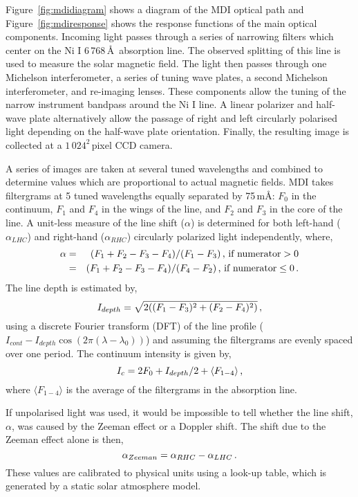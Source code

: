Figure~\ref{fig:mdidiagram} shows a diagram of the MDI optical path and Figure~\ref{fig:mdiresponse} shows the response functions of the main optical components. Incoming light passes through a series of narrowing filters which center on the Ni I 6\,768\,\AA\ absorption line. The observed  splitting of this line is used to measure the solar magnetic field. The light then passes through one Michelson interferometer, a series of tuning wave plates, a second Michelson interferometer, and re-imaging lenses. These components allow the tuning of the narrow instrument bandpass around the Ni I line. A linear polarizer and half-wave plate alternatively allow the passage of right and left circularly polarised light depending on the half-wave plate orientation.
Finally, the resulting image is collected at a $1\,024^2$\,pixel \gls{CCD} camera.

A series of images are taken at several tuned wavelengths and combined to determine values which are proportional to actual magnetic fields. MDI takes filtergrams at 5 tuned wavelengths equally separated by 75\,m\AA: $F_{0}$ in the continuum, $F_{1}$ and $F_{4}$ in the wings of the line, and $F_{2}$ and $F_{3}$ in the core of the line. A unit-less measure of the line shift ($\alpha$) is determined for both left-hand ($\alpha_{LHC}$) and right-hand ($\alpha_{RHC}$) circularly polarized light independently, where,
\begin{eqnarray}
\alpha &=& (F_{1}+F_{2}-F_{3}-F_{4})/(F_{1}-F_{3}) \mbox{\,, if numerator} > 0 \\
&=& (F_{1}+F_{2}-F_{3}-F_{4})/(F_{4}-F_{2}) \mbox{\,, if numerator} \le 0 \mbox{\,.}
\end{eqnarray}
The line depth is estimated by,
\begin{equation}
I_{depth} = \sqrt{2 ((F_1-F_3)^2 + (F_2-F_4)^2)} \mbox{\,,}
\end{equation}
using a discrete Fourier transform (DFT) of the line profile ($I_{cont}-I_{depth}\cos(2\pi (\lambda - \lambda_0))$) and assuming the filtergrams are evenly spaced over one period. The continuum intensity is given by,
\begin{equation}
I_c = 2F_0 + I_{depth}/2 + \langle F_{1-4} \rangle \mbox{\,,}
\end{equation}
where $\langle F_{1-4} \rangle$ is the average of the filtergrams in the absorption line.

If unpolarised light was used, it would be impossible to tell whether the line shift, $\alpha$, was caused by the Zeeman effect or a Doppler shift. The shift due to the Zeeman effect alone is then,
\begin{equation}
\alpha_{Zeeman}=\alpha_{RHC}-\alpha_{LHC} \mbox{\,.}
\end{equation}
These values are calibrated to physical units using a look-up table, which is generated by a static solar atmosphere model. 


